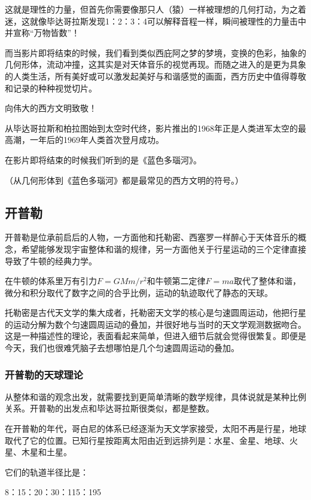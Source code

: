 这就是理性的力量，但首先你需要像那只人（猿）一样被理想的几何打动，为之着迷，这就像毕达哥拉斯发现1：2：3：4可以解释音程一样，瞬间被理性的力量击中并宣称“万物皆数”！

而当影片即将结束的时候，我们看到类似西庇阿之梦的梦境，变换的色彩，抽象的几何形体，流动冲撞，这其实是对天体音乐的视觉再现。而随之进入的是更为具象的人类生活，所有美好或可以激发起美好与和谐感觉的画面，西方历史中值得尊敬和记录的种种视觉切片。

向伟大的西方文明致敬！

从毕达哥拉斯和柏拉图始到太空时代终，影片推出的1968年正是人类进军太空的最高潮，一年后的1969年人类首次登月成功。

在影片即将结束的时候我们听到的是《蓝色多瑙河》。

（从几何形体到《蓝色多瑙河》都是最常见的西方文明的符号。）


\subsection{开普勒}

开普勒是位承前启后的人物，一方面他和托勒密、西塞罗一样醉心于天体音乐的概念，希望能够发现宇宙整体和谐的规律，另一方面他关于行星运动的三个定律直接导致了牛顿的经典力学。

在牛顿的体系里万有引力$F = G M m /r^2$和牛顿第二定律$F = ma$取代了整体和谐，微分和积分取代了数字之间的合乎比例，运动的轨迹取代了静态的天球。

托勒密是古代天文学的集大成者，托勒密天文学的核心是匀速圆周运动，他把行星的运动分解为数个匀速圆周运动的叠加，并很好地与当时的天文学观测数据吻合。这是一种描述性的理论，表面看起来简单，但进入细节后就会觉得很繁复。即便是今天，我们也很难凭脑子去想哪怕是几个匀速圆周运动的叠加。

\subsubsection{开普勒的天球理论}

从整体和谐的观念出发，就需要找到更简单清晰的数学规律，具体说就是某种比例关系。开普勒的出发点和毕达哥拉斯很类似，都是整数。

在开普勒的年代，哥白尼的体系已经逐渐为天文学家接受，太阳不再是行星，地球取代了它的位置。已知行星按距离太阳由近到远排列是：水星、金星、地球、火星、木星和土星。

它们的轨道半径比是：

\begin{center}
8：15：20：30：115：195
\end{center}

